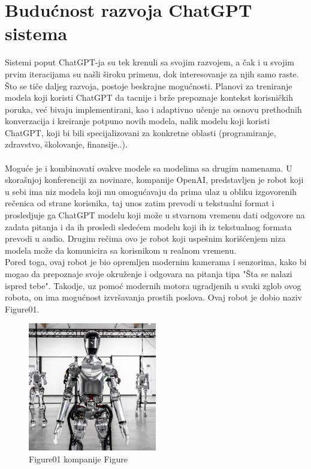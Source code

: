 \documentclass[fleqn, 12pt]{article}
\begin{document}
\section{Budućnost razvoja ChatGPT sistema}
\begin{text}
Sistemi poput ChatGPT-ja su tek krenuli sa svojim razvojem, a čak i u svojim prvim iteracijama su našli široku primenu, dok interesovanje za njih samo raste.
\\
Što se tiče daljeg razvoja, postoje beskrajne mogućnosti. Planovi za treniranje modela koji koristi ChatGPT da tacnije i brže prepoznaje kontekst korisničkih poruka, već bivaju implementirani, 
kao i adaptivno učenje na osnovu prethodnih konverzacija i kreiranje potpuno novih modela, nalik modelu koji koristi ChatGPT, koji bi bili specijalizovani za konkretne oblasti (programiranje, zdravstvo, školovanje, finansije..). \cite{G9}
\\\\
Moguće je i kombinovati ovakve modele sa modelima sa drugim namenama. U skorašnjoj konferenciji za novinare, kompanije OpenAI, predstavljen je robot koji u sebi ima niz modela koji mu omogućavaju da prima ulaz u obliku izgovorenih rečenica od strane korisnika, taj unos zatim prevodi u tekstualni format i prosledjuje ga ChatGPT modelu koji može u stvarnom vremenu dati odgovore na zadata pitanja i da ih prosledi sledećem modelu koji ih iz tekstualnog formata prevodi u audio. Drugim rečima ovo je robot koji uspešnim korišćenjem niza modela može da komunicira sa korisnikom u realnom vremenu. \cite{G10}
\\
Pored toga, ovaj robot je bio opremljen modernim kamerama i senzorima, kako bi mogao da prepoznaje svoje okruženje i odgovara na pitanja tipa "Šta se nalazi ispred tebe". Takodje, uz pomoć modernih motora ugradjenih u svaki zglob ovog robota, on ima mogućnost izvršavanja prostih poslova. Ovaj robot je dobio naziv Figure01. \cite{G10}
\end{text}

\begin{figure}[h]
    \centering
    \includegraphics[width=0.5\textwidth]{Figure.jpg}
    \caption{Figure01 kompanije Figure}
\end{figure}
\end{document}
